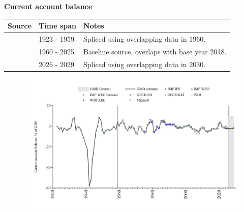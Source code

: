 \documentclass[12pt,a4paper,landscape]{article}
\begin{document}
\begin{adjustbox}{max totalsize={\paperwidth}{\paperheight},center}
\begin{minipage}[t][\textheight][t]{\textwidth}
\vspace*{0.5cm}
{}
\begin{center}
{\Large\bfseries Current account balance}
\end{center}
\vspace{0.5cm}
\begin{table}[H]
\centering
\small
\begin{tabular}{|l|l|l|}
\hline
\textbf{Source} & \textbf{Time span} & \textbf{Notes} \\
\hline
\rowcolor{white}\cite{Mitchell}& 1923 - 1959 &Spliced using overlapping data in 1960. \\
\rowcolor{lightgray}\cite{OECD_EO}& 1960 - 2025 &Baseline source, overlaps with base year 2018. \\
\rowcolor{white}\cite{IMF_WEO_forecast}& 2026 - 2029 &Spliced using overlapping data in 2030. \\
\hline
\end{tabular}
\end{table}
\begin{figure}[H]
\centering
\includegraphics[width=\textwidth,height=0.6\textheight,keepaspectratio]{graphs/ZAF_CA_GDP.pdf}
\end{figure}
\end{minipage}
\end{adjustbox}
\end{document}
